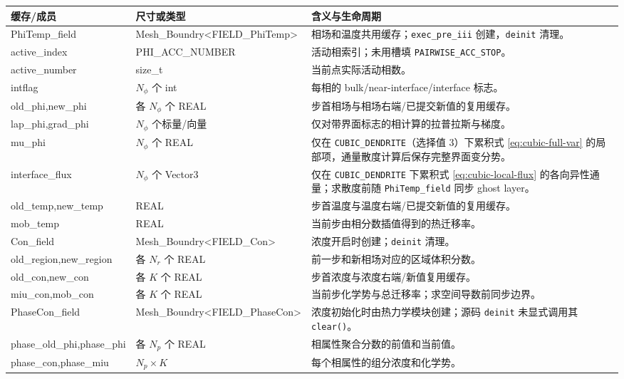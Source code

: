 \documentclass[UTF8,a4paper,11pt]{ctexart}
\newcommand{\code}[1]{\texttt{#1}}
\begin{document}
\begin{longtable}{>{\ttfamily}p{}p{}p{}}
\toprule
\normalfont 缓存/成员 & 尺寸或类型 & 含义与生命周期\\
\midrule
\endhead
PhiTemp\_field & Mesh\_Boundry<FIELD\_PhiTemp> & 相场和温度共用缓存；\code{exec\_pre\_iii} 创建，\code{deinit} 清理。\\
active\_index & PHI\_ACC\_NUMBER & 活动相索引；未用槽填 \code{PAIRWISE\_ACC\_STOP}。\\
active\_number & size\_t & 当前点实际活动相数。\\
intflag & $N_\phi$ 个 int & 每相的 bulk/near-interface/interface 标志。\\
old\_phi,new\_phi & 各 $N_\phi$ 个 REAL & 步首相场与相场右端/已提交新值的复用缓存。\\
lap\_phi,grad\_phi & $N_\phi$ 个标量/向量 & 仅对带界面标志的相计算的拉普拉斯与梯度。\\
mu\_phi & $N_\phi$ 个 REAL & 仅在 \code{CUBIC\_DENDRITE}（选择值 3）下累积式 \eqref{eq:cubic-full-var} 的局部项，通量散度计算后保存完整界面变分势。\\
interface\_flux & $N_\phi$ 个 Vector3 & 仅在 \code{CUBIC\_DENDRITE} 下累积式 \eqref{eq:cubic-local-flux} 的各向异性通量；求散度前随 \code{PhiTemp\_field} 同步 ghost layer。\\
old\_temp,new\_temp & REAL & 步首温度与温度右端/已提交新值的复用缓存。\\
mob\_temp & REAL & 当前步由相分数插值得到的热迁移率。\\
\midrule
Con\_field & Mesh\_Boundry<FIELD\_Con> & 浓度开启时创建；\code{deinit} 清理。\\
old\_region,new\_region & 各 $N_r$ 个 REAL & 前一步和新相场对应的区域体积分数。\\
old\_con,new\_con & 各 $K$ 个 REAL & 步首浓度与浓度右端/新值复用缓存。\\
miu\_con,mob\_con & 各 $K$ 个 REAL & 当前步化学势与总迁移率；求空间导数前同步边界。\\
\midrule
PhaseCon\_field & Mesh\_Boundry<FIELD\_PhaseCon> & 浓度初始化时由热力学模块创建；源码 \code{deinit} 未显式调用其 \code{clear()}。\\
phase\_old\_phi,phase\_phi & 各 $N_p$ 个 REAL & 相属性聚合分数的前值和当前值。\\
phase\_con,phase\_miu & $N_p\times K$ & 每个相属性的组分浓度和化学势。\\
\bottomrule
\end{longtable}
\end{document}
